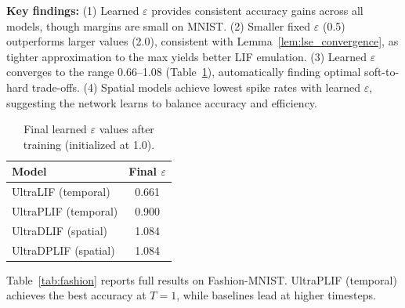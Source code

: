 \documentclass{article}
\theoremstyle{plain}
\theoremstyle{definition}
\theoremstyle{remark}
\newcommand{\eps}{\varepsilon}
\begin{document}
\textbf{Key findings:} (1) Learned $\eps$ provides consistent accuracy gains across all models, though margins are small on MNIST. (2) Smaller fixed $\eps$ (0.5) outperforms larger values (2.0), consistent with Lemma~\ref{lem:lse_convergence}, as tighter approximation to the max yields better LIF emulation. (3) Learned $\eps$ converges to the range 0.66--1.08 (Table~\ref{tab:eps_final}), automatically finding optimal soft-to-hard trade-offs. (4) Spatial models achieve lowest spike rates with learned $\eps$, suggesting the network learns to balance accuracy and efficiency.

\begin{table}[h]
\caption{Final learned $\eps$ values after training (initialized at 1.0).}
\label{tab:eps_final}
\vskip 0.1in
\begin{center}
\begin{small}
\begin{tabular}{lc}
\toprule
Model & Final $\eps$ \\
\midrule
UltraLIF (temporal)  & 0.661 \\
UltraPLIF (temporal) & 0.900 \\
UltraDLIF (spatial)  & 1.084 \\
UltraDPLIF (spatial) & 1.084 \\
\bottomrule
\end{tabular}
\end{small}
\end{center}
\vskip -0.1in
\end{table}

Table~\ref{tab:fashion} reports full results on Fashion-MNIST. UltraPLIF (temporal) achieves the best accuracy at $T{=}1$, while baselines lead at higher timesteps.
\end{document}
